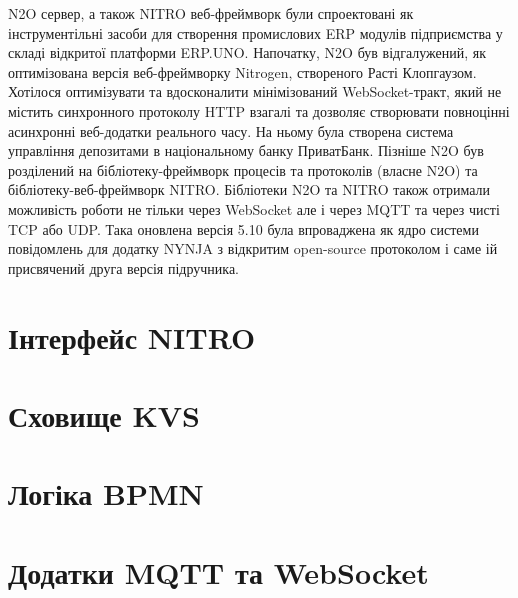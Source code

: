 N2O сервер, а також NITRO веб-фреймворк були спроектовані як інструментільні засоби
для створення промислових ERP модулів підприємства у складі відкритої платформи ERP.UNO.
Напочатку, N2O був відгалужений, як оптимізована версія веб-фреймворку Nitrogen,
створеного Расті Клопгаузом. Хотілося оптимізувати та вдосконалити мінімізований
WebSocket-тракт, який не містить синхронного протоколу HTTP взагалі та дозволяє
створювати повноцінні асинхронні веб-додатки реального часу. На ньому була створена
система управління депозитами в національному банку ПриватБанк. Пізніше N2O був розділений
на бібліотеку-фреймворк процесів та протоколів (власне N2O) та бібліотеку-веб-фреймворк NITRO.
Бібліотеки N2O та NITRO також отримали можливість роботи не тільки через WebSocket але і
через MQTT та через чисті TCP або UDP. Така оновлена версія 5.10 була впроваджена як ядро
системи повідомлень для додатку NYNJA з відкритим open-source протоколом і саме ій
присвячений друга версія підручника.

\newpage
\section{Інтерфейс NITRO}

\section{Сховище KVS}

\section{Логіка BPMN}



\section{Додатки MQTT та WebSocket}

